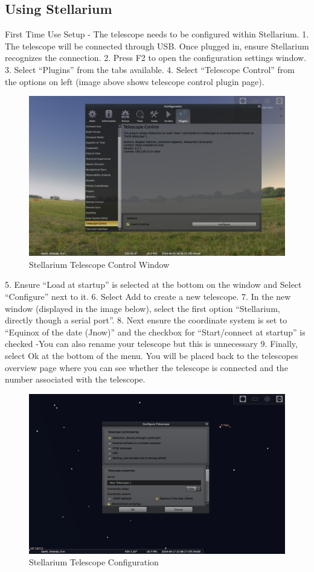 \documentclass[12pt]{report}
\begin{document}
\subsection{Using Stellarium}

First Time Use Setup - The telescope needs to be configured within Stellarium.
	1. The telescope will be connected through USB. Once plugged in, ensure Stellarium recognizes the connection.
  2. Press F2 to open the configuration settings window.
  3. Select “Plugins” from the tabs available.
  4. Select “Telescope Control” from the options on left (image above shows telescope control plugin page).

\begin{figure}[h]
	\centering
	\includegraphics[width=0.75\linewidth]{stellTeleWindow}
	\caption{Stellarium Telescope Control Window}
\end{figure}

  5. Ensure “Load at startup” is selected at the bottom on the window and Select “Configure” next to it.
  6. Select Add to create a new telescope.
  7. In the new window (displayed in the image below), select the first option “Stellarium, directly though a serial port”.
  8. Next ensure the coordinate system is set to “Equinox of the date (Jnow)” and the checkbox for “Start/connect at startup” is checked
    -You can also rename your telescope but this is unnecessary
  9. Finally, select Ok at the bottom of the menu. You will be placed back to the telescopes overview page where you can see whether the telescope is connected and the number associated with the telescope.

\begin{figure}[h]
	\centering
	\includegraphics[width=0.75\linewidth]{stellConfig}
	\caption{Stellarium Telescope Configuration}
\end{figure}
\end{document}
